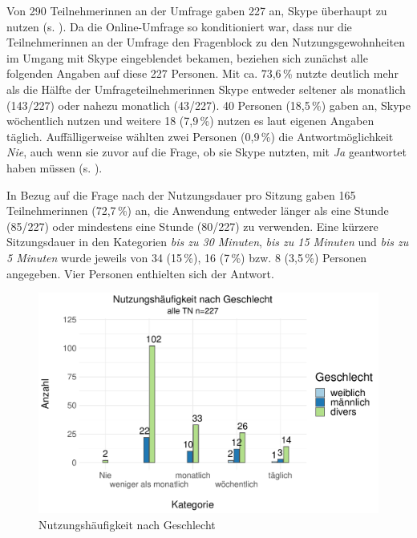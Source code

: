 Von 290 Teilnehmer{\textperiodcentered}innen an der Umfrage gaben 227 an, Skype überhaupt zu nutzen (s. ). Da die Online-Umfrage so konditioniert war, dass nur die Teilnehmer{\textperiodcentered}innen an der Umfrage den Fragenblock zu den Nutzungsgewohnheiten im Umgang mit Skype eingeblendet bekamen, beziehen sich zunächst alle folgenden Angaben auf diese 227 Personen. Mit ca. 73,6\,\% nutzte deutlich mehr als die Hälfte der Umfrageteilnehmer{\textperiodcentered}innen Skype entweder seltener als monatlich (143/227) oder nahezu monatlich (43/227). 40 Personen (18,5\,\%) gaben an, Skype wöchentlich nutzen und weitere 18 (7,9\,\%) nutzen es laut eigenen Angaben täglich. Auffälligerweise wählten zwei Personen (0,9\,\%) die Antwortmöglichkeit \emph{Nie}, auch wenn sie zuvor auf die Frage, ob sie Skype nutzten, mit \emph{Ja} geantwortet haben müssen (s. ).

In Bezug auf die Frage nach der Nutzungsdauer pro Sitzung gaben 165 Teilnehmer{\textperiodcentered}innen (72,7\,\%) an, die Anwendung entweder länger als eine Stunde (85/227) oder mindestens eine Stunde (80/227) zu verwenden. Eine kürzere Sitzungsdauer in den Kategorien \emph{bis zu 30 Minuten}, \emph{bis zu 15 Minuten} und \emph{bis zu 5 Minuten} wurde jeweils von 34 (15\,\%), 16 (7\,\%) bzw. 8 (3,5\,\%) Personen angegeben. Vier Personen enthielten sich der Antwort.


\begin{figure}
		\includegraphics[width=.85\textwidth]{Figures/Umfrage/GGplot/ggplot_Geschlecht-Nutzungsh}
	\caption{Nutzungshäufigkeit nach Geschlecht\label{K6:fig:Nutzungsh-mw}}
\end{figure}

